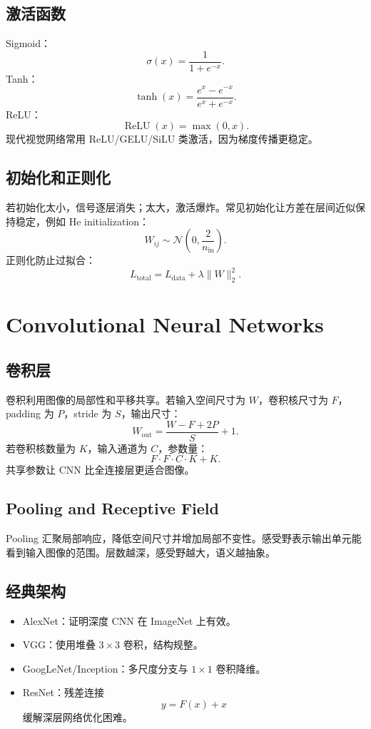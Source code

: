 \documentclass[11pt]{article}
\newcommand{\ReLU}{\operatorname{ReLU}}
\begin{document}
\subsection{激活函数}

Sigmoid：
\[
  \sigma(x)=\frac{1}{1+e^{-x}}.
\]
Tanh：
\[
  \tanh(x)=\frac{e^x-e^{-x}}{e^x+e^{-x}}.
\]
ReLU：
\[
  \ReLU(x)=\max(0,x).
\]
现代视觉网络常用 ReLU/GELU/SiLU 类激活，因为梯度传播更稳定。

\subsection{初始化和正则化}

若初始化太小，信号逐层消失；太大，激活爆炸。常见初始化让方差在层间近似保持稳定，例如 He initialization：
\[
  W_{ij}\sim \mathcal N\left(0,\frac{2}{n_{\text{in}}}\right).
\]
正则化防止过拟合：
\[
  L_{\text{total}}=L_{\text{data}}+\lambda\|W\|_2^2.
\]

\section{Convolutional Neural Networks}

\subsection{卷积层}

卷积利用图像的局部性和平移共享。若输入空间尺寸为 $W$，卷积核尺寸为 $F$，padding 为 $P$，stride 为 $S$，输出尺寸：
\[
  W_{\text{out}}=\frac{W-F+2P}{S}+1.
\]
若卷积核数量为 $K$，输入通道为 $C$，参数量：
\[
  F\cdot F\cdot C\cdot K+K.
\]
共享参数让 CNN 比全连接层更适合图像。

\subsection{Pooling and Receptive Field}

Pooling 汇聚局部响应，降低空间尺寸并增加局部不变性。感受野表示输出单元能看到输入图像的范围。层数越深，感受野越大，语义越抽象。

\subsection{经典架构}

\begin{itemize}
  \item AlexNet：证明深度 CNN 在 ImageNet 上有效。
  \item VGG：使用堆叠 $3\times3$ 卷积，结构规整。
  \item GoogLeNet/Inception：多尺度分支与 $1\times1$ 卷积降维。
  \item ResNet：残差连接
  \[
    y=F(x)+x
  \]
  缓解深层网络优化困难。
\end{itemize}
\end{document}
